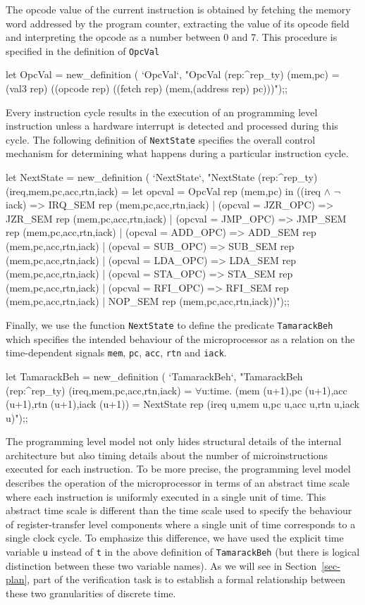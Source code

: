 The opcode value of the current instruction is obtained by fetching
the memory word addressed by the program counter, extracting
the value of its opcode field and interpreting the opcode as
a number between 0 and 7.  This procedure is specified in the
definition of \verb"OpcVal"

\begintt
let OpcVal = new_definition (
    `OpcVal`,
    "OpcVal (rep:^rep_ty) (mem,pc) =
      (val3 rep) ((opcode rep) ((fetch rep) (mem,(address rep) pc)))");;
\endtt

Every instruction cycle results in the execution of an
programming level instruction
unless a hardware interrupt is
detected and processed during this cycle.
The following definition of \verb"NextState"
specifies the overall control mechanism for determining what
happens during a particular instruction cycle.

\begintt
let NextState = new_definition (
  `NextState`,
  "NextState (rep:^rep_ty) (ireq,mem,pc,acc,rtn,iack) =
    let opcval = OpcVal rep (mem,pc) in
    ((ireq \(\wedge\) \(\neg\)iack)    => IRQ_SEM rep (mem,pc,acc,rtn,iack) |
     (opcval = JZR_OPC) => JZR_SEM rep (mem,pc,acc,rtn,iack) |
     (opcval = JMP_OPC) => JMP_SEM rep (mem,pc,acc,rtn,iack) |
     (opcval = ADD_OPC) => ADD_SEM rep (mem,pc,acc,rtn,iack) |
     (opcval = SUB_OPC) => SUB_SEM rep (mem,pc,acc,rtn,iack) |
     (opcval = LDA_OPC) => LDA_SEM rep (mem,pc,acc,rtn,iack) |
     (opcval = STA_OPC) => STA_SEM rep (mem,pc,acc,rtn,iack) |
     (opcval = RFI_OPC) => RFI_SEM rep (mem,pc,acc,rtn,iack) |
                           NOP_SEM rep (mem,pc,acc,rtn,iack))");;
\endtt

Finally, we use the function \verb"NextState" to define the predicate
\verb"TamarackBeh" which specifies the intended behaviour of the
microprocessor as a relation on the time-dependent signals
\verb"mem",
\verb"pc",
\verb"acc",
\verb"rtn" and
\verb"iack".

\begintt
let TamarackBeh = new_definition (
  `TamarackBeh`,
  "TamarackBeh (rep:^rep_ty) (ireq,mem,pc,acc,rtn,iack) =
    \(\forall\)u:time.
      (mem (u+1),pc (u+1),acc (u+1),rtn (u+1),iack (u+1)) =
      NextState rep (ireq u,mem u,pc u,acc u,rtn u,iack u)");;
\endtt

The programming level model
not only hides structural details of the internal architecture
but also timing details about the number of
microinstructions executed for each instruction.
To be more precise, the programming level model describes
the operation of the microprocessor in terms of an abstract time scale
where each instruction is uniformly executed in a single unit of time.
This abstract time scale is different than the time scale
used to specify the behaviour of register-transfer level components
where a single unit of time corresponds to a single clock cycle.
To emphasize this difference,
we have used the explicit time variable \verb"u" instead of \verb"t"
in the above definition of \verb"TamarackBeh"
(but there is logical
distinction between these two variable names).
As we will see in Section~\ref{sec-plan},
part of the verification task is to establish
a formal relationship between these two granularities of discrete time.

